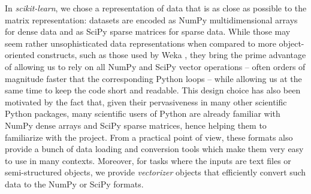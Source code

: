 \documentclass{llncs}
\newcommand{\sklearn}{\textit{scikit-learn}\xspace}
\begin{document}
In \sklearn, we chose a representation of data that is as close as
possible to the matrix representation: datasets are encoded as NumPy
multidimensional arrays for dense data and as SciPy sparse matrices for sparse
data. While those may seem rather unsophisticated data representations when
compared to more object-oriented constructs, such as those used by
Weka \citep{hall2009weka}, they bring the prime advantage of allowing us to rely
on all NumPy and SciPy vector operations -- often orders of magnitude faster
that the corresponding Python loops -- while allowing us at the same time to
keep the code short and readable.  This design choice has also been motivated by
the fact that, given their pervasiveness in many other scientific Python
packages, many scientific users of Python are already familiar with NumPy dense
arrays and SciPy sparse matrices, hence helping them to familiarize with the
project.  From a practical point of view, these formats also provide a bunch of
data loading and conversion tools which make them very easy to use in many
contexts. Moreover, for tasks where the inputs are text files or semi-structured
objects, we provide \textit{vectorizer} objects that efficiently convert such
data to the NumPy or SciPy formats.


\end{document}
